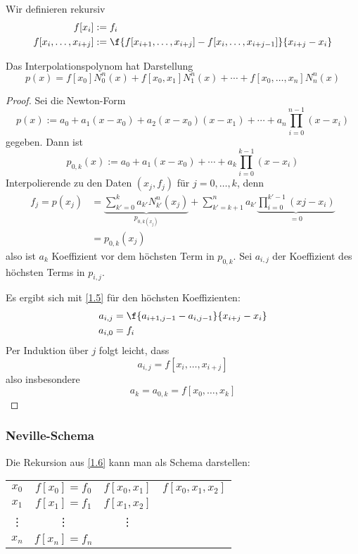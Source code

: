 \documentclass[11pt]{scrartcl}
\begin{document}
\begin{df}
	\label{1.6}
	Wir definieren rekursiv
	\begin{align*}
		f[x_i] &:= f_i\\
		f[x_i,\dotsc,x_{i+j}] &:= \f {f[x_{i+1},\dotsc,x_{i+j}] - f[x_i,\dotsc,x_{i+j-1}]}{x_{i+j}-x_i}
	\end{align*}
\end{df}

\begin{st}
	\label{1.7}
	Das Interpolationspolynom hat Darstellung
	\[
		p(x) = f[x_0]N_0^n(x) + f[x_0,x_1]N_1^n(x) + \dotsb + f[x_0,\dotsc,x_n]N_n^n(x)
	\]
	\begin{proof}
		Sei die Newton-Form
		\[
			p(x) := a_0 + a_1(x-x_0) + a_2(x-x_0)(x-x_1) + \dotsb + a_n\prod_{i=0}^{n-1}(x-x_i)
		\]
		gegeben.
		Dann ist
		\[
			p_{0,k}(x) := a_0 + a_1(x-x_0) + \dotsb + a_k\prod_{i=0}^{k-1}(x-x_i)
		\]
		Interpolierende zu den Daten $(x_j,f_j)$ für $j=0,\dotsc,k$, denn
		\begin{align*}
			f_j = p(x_j) &= \underbrace{\sum_{k'=0}^ka_{k'}N_{k'}^n(x_j)}_{p_{0,k(x_j)}} + \sum_{k'=k+1}^n a_{k'}\underbrace{\prod_{i=0}^{k'-1}(xj-x_i)}_{=0}\\
			&= p_{0,k}(x_j)
		\end{align*}
		also ist $a_k$ Koeffizient vor dem höchsten Term in $p_{0,k}$.
		Sei $a_{i,j}$ der Koeffizient des höchsten Terms in $p_{i,j}$.

		Es ergibt sich mit \ref{1.5} für den höchsten Koeffizienten:
		\begin{align*}
			a_{i,j} &= \f {a_{i+1,j-1} - a_{i,j-1}}{x_{i+j}-x_i}\\
			a_{i,0} &= f_i
		\end{align*}
		Per Induktion über $j$ folgt leicht, dass
		\[
			a_{i,j} = f[x_i,\dotsc, x_{i+j}]
		\]
		also insbesondere
		\[
			a_k = a_{0,k} = f[x_0,\dotsc, x_k]
		\]
	\end{proof}
\end{st}

\subsubsection{Neville-Schema}

Die Rekursion aus \ref{1.6} kann man als Schema darstellen:

\begin{tabular}{cccc}
$x_0$ & $f[x_0]=f_0$ & $f[x_0,x_1]$ & $f[x_0,x_1,x_2]$ \\
$x_1$ & $f[x_1]=f_1$ & $f[x_1,x_2]$ &  \\
\vdots & \vdots & \vdots\\
$x_n$ & $f[x_n]=f_n$ &\\
\end{tabular}
\end{document}
